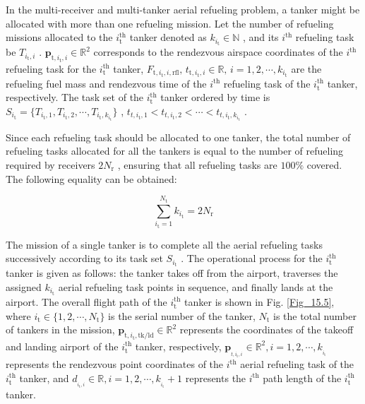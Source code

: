 In the multi-receiver and multi-tanker aerial refueling problem, a tanker might be allocated with more than one refueling mission. Let the number of refueling missions allocated to the $i_{\text{t}}^{\text{th}}$  tanker denoted as $k_{i_{\text{t}}}\in\mathbb{N}$ , and its  $i_{}^{\text{th}}$ refueling task be $T_{i_\text{t},i}$ . $\mathbf{p}_{\mathrm{t},i_\mathrm{t},i}\in\mathbb{R}^2$   corresponds to the rendezvous airspace coordinates of the $i_{}^{\text{th}}$  refueling task for the $i_{\text{t}}^{\text{th}}$  tanker, $F_{\text{t},i_\text{t},i,\text{rfl}}\text{, }t_{\text{t},i_\text{t},i}\in\mathbb{R}\text{, }i=1,2,\cdots,k_{i_\text{t}}$  are the refueling fuel mass and rendezvous time of the $i_{}^{\text{th}}$  refueling task of the $i_{\text{t}}^{\text{th}}$  tanker, respectively. The task set of the $i_{\text{t}}^{\text{th}}$  tanker ordered by time is $S_{i_{\text{t}}}=\{T_{i_{\text{t}},1},T_{i_{\text{t}},2},\cdots,T_{i_{\text{t}},k_{i_{\text{t}}}}\}$ , $t_{t,i_\text{t},1}<t_{t,i_\text{t},2}<\cdots<t_{t,i_\text{t},k_{i_\text{t}}}$ .

Since each refueling task should be allocated to one tanker, the total number of refueling tasks allocated for all the tankers is equal to the number of refueling required by receivers $2N_\text{r}$ , ensuring that all refueling tasks are $100\%$ covered. The following equality can be obtained:

\begin{equation}
\sum_{i_\text{t}=1}^{N_\text{t}}k_{i_\text{t}}=2N_\text{r}
\label{eq:15.22}
\end{equation}

The mission of a single tanker is to complete all the aerial refueling tasks successively according to its task set $S_{i_{\text{t}}}$ . The operational process for the  $i_{\text{t}}^{\text{th}}$ tanker is given as follows: the tanker takes off from the airport, traverses the assigned $k_{i_{\text{t}}}$ aerial refueling task points in sequence, and finally lands at the airport. The overall flight path of the $i_{\text{t}}^{\text{th}}$ tanker is shown in Fig. \ref{Fig_15.5}, where $i_{\text{t}}\in\{1,2,\cdots,N_{\text{t}}\}$ is the serial number of the tanker,  $N_{\text{t}}$ is the total number of tankers in the  mission, $\mathbf{p}_{\text{t},i_\text{t},\text{tk}/\text{ld}}\in\mathbb{R}^2$ represents the coordinates of the takeoff and landing airport of the $i_{\text{t}}^{\text{th}}$ tanker, respectively,  $\mathbf{p}_{_{t,i_\text{t},i}}\in\mathbb{R}^{2},i=1,2,\cdots,k_{_{i_\text{t}}}$  represents the rendezvous point coordinates of the $i_{}^{\text{th}}$  aerial refueling task of the $i_{\text{t}}^{\text{th}}$ tanker, and  $d_{_{i_\text{t},i}}\in\mathbb{R},i=1,2,\cdots,k_{_{i_\text{t}}}+1$  represents the $i_{}^{\text{th}}$  path length of the $i_{\text{t}}^{\text{th}}$  tanker.

